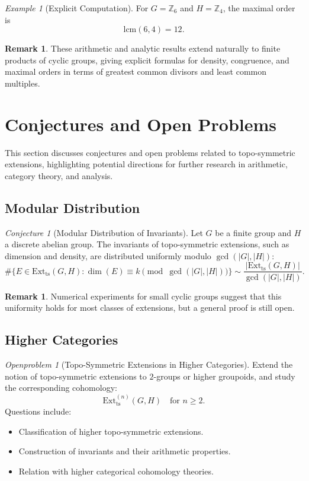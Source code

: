 \documentclass[11pt,a4paper]{article}
\theoremstyle{plain}
\theoremstyle{definition}
\newtheorem{remark}[theorem]{Remark}
\theoremstyle{remark}
\newtheorem{example}[theorem]{Example}
\newtheorem{conjecture}[theorem]{Conjecture}
\newtheorem{openproblem}[theorem]{Openproblem}
\begin{document}
	\begin{example}[Explicit Computation]
		For $G = \mathbb{Z}_6$ and $H = \mathbb{Z}_4$, the maximal order is
		\[
		\mathrm{lcm}(6,4) = 12.
		\]
	\end{example}
	
	\begin{remark}
		These arithmetic and analytic results extend naturally to finite products of cyclic groups, giving explicit formulas for density, congruence, and maximal orders in terms of greatest common divisors and least common multiples.
	\end{remark}
	\section{Conjectures and Open Problems}
	
	This section discusses conjectures and open problems related to topo-symmetric extensions, highlighting potential directions for further research in arithmetic, category theory, and analysis.
	
	\subsection{Modular Distribution}
	
	\begin{conjecture}[Modular Distribution of Invariants]
		Let $G$ be a finite group and $H$ a discrete abelian group.  
		The invariants of topo-symmetric extensions, such as dimension and density, are distributed uniformly modulo $\gcd(|G|,|H|)$:
		\[
		\#\{ E \in \mathrm{Ext}_{\mathrm{ts}}(G,H) : \dim(E) \equiv k \pmod{\gcd(|G|,|H|)} \} \sim \frac{|\mathrm{Ext}_{\mathrm{ts}}(G,H)|}{\gcd(|G|,|H|)}.
		\]
	\end{conjecture}
	
	\begin{remark}
		Numerical experiments for small cyclic groups suggest that this uniformity holds for most classes of extensions, but a general proof is still open.
	\end{remark}
	
	\subsection{Higher Categories}
	
	\begin{openproblem}[Topo-Symmetric Extensions in Higher Categories]
		Extend the notion of topo-symmetric extensions to $2$-groups or higher groupoids, and study the corresponding cohomology:
		\[
		\mathrm{Ext}_{\mathrm{ts}}^{(n)}(G,H) \quad \text{for } n \ge 2.
		\]
		Questions include:  
		\begin{itemize}
			\item Classification of higher topo-symmetric extensions.
			\item Construction of invariants and their arithmetic properties.
			\item Relation with higher categorical cohomology theories.
		\end{itemize}
	\end{openproblem}
	
\end{document}
